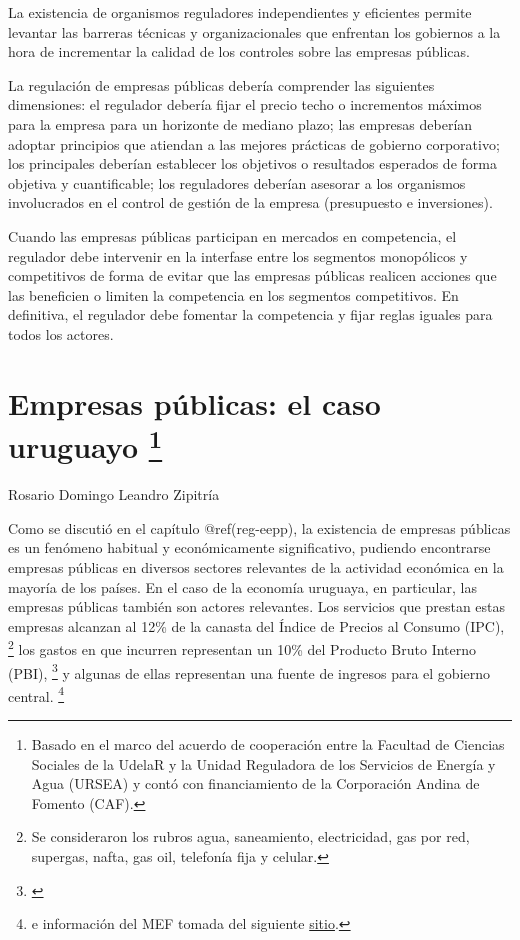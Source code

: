 \documentclass[
  12pt,
  spanish,
]{book}
\begin{document}
La existencia de organismos reguladores independientes y eficientes
permite levantar las barreras técnicas y organizacionales que enfrentan
los gobiernos a la hora de incrementar la calidad de los controles sobre
las empresas públicas.

La regulación de empresas públicas debería comprender las siguientes
dimensiones: el regulador debería fijar el precio techo o incrementos
máximos para la empresa para un horizonte de mediano plazo; las empresas
deberían adoptar principios que atiendan a las mejores prácticas de
gobierno corporativo; los principales deberían establecer los objetivos
o resultados esperados de forma objetiva y cuantificable; los
reguladores deberían asesorar a los organismos involucrados en el
control de gestión de la empresa (presupuesto e inversiones).

Cuando las empresas públicas participan en mercados en competencia, el
regulador debe intervenir en la interfase entre los segmentos
monopólicos y competitivos de forma de evitar que las empresas públicas
realicen acciones que las beneficien o limiten la competencia en los
segmentos competitivos. En definitiva, el regulador debe fomentar la
competencia y fijar reglas iguales para todos los actores.

\hypertarget{eepp-uy}{%
\chapter[Empresas públicas: el caso uruguayo ]{\texorpdfstring{Empresas
públicas: el caso uruguayo \footnote{Basado en el marco del acuerdo de
  cooperación entre la Facultad de Ciencias Sociales de la UdelaR y la
  Unidad Reguladora de los Servicios de Energía y Agua (URSEA) y contó
  con financiamiento de la Corporación Andina de Fomento (CAF).}}{Empresas públicas: el caso uruguayo }}\label{eepp-uy}}

Rosario Domingo Leandro Zipitría

Como se discutió en el capítulo @ref(reg-eepp), la existencia de
empresas públicas es un fenómeno habitual y económicamente
significativo, pudiendo encontrarse empresas públicas en diversos
sectores relevantes de la actividad económica en la mayoría de los
países. En el caso de la economía uruguaya, en particular, las empresas
públicas también son actores relevantes. Los servicios que prestan estas
empresas alcanzan al 12\% de la canasta del Índice de Precios al Consumo
(IPC), \footnote{Se consideraron los rubros agua, saneamiento,
  electricidad, gas por red, supergas, nafta, gas oil, telefonía fija y
  celular.} los gastos en que incurren representan un 10\% del Producto
Bruto Interno (PBI), \footnote{\citet{WorldBank2014}} y algunas de ellas
representan una fuente de ingresos para el gobierno central. \footnote{\citet{WorldBank1995}
  e información del MEF tomada del siguiente
  \href{http://www.mef.gub.uy/indicadores.php}{sitio}.}
\end{document}
